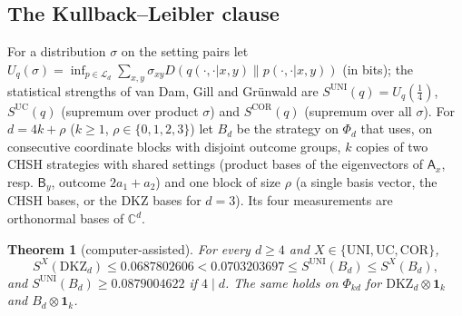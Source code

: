 \documentclass[11pt]{amsart}
\newtheorem{theorem}{Theorem}[section]
\theoremstyle{definition}
\theoremstyle{remark}
\numberwithin{equation}{section}
\newcommand{\C}{\mathbb{C}}
\newcommand{\one}{\mathbf{1}}
\newcommand{\cL}{\mathcal{L}}
\newcommand{\DKZ}{\mathrm{DKZ}}
\begin{document}
\subsection{The Kullback--Leibler clause}
For a distribution $\sigma$ on the setting pairs let
$U_q(\sigma)=\inf_{p\in\cL_d}\sum_{x,y}\sigma_{xy}D(q(\cdot,\cdot|x,y)\|p(\cdot,\cdot|x,y))$ (in bits); the statistical
strengths of van Dam, Gill and Gr\"unwald\cite{vDGG} are $S^{\mathrm{UNI}}(q)=U_q(\frac14)$, $S^{\mathrm{UC}}(q)$ (supremum over
product $\sigma$) and $S^{\mathrm{COR}}(q)$ (supremum over all $\sigma$). For $d=4k+\rho$ ($k\ge1$, $\rho\in\{0,1,2,3\}$)
let $B_d$ be the strategy on $\Phi_d$ that uses, on consecutive coordinate blocks with disjoint outcome groups, $k$
copies of two CHSH strategies with shared settings (product bases of the eigenvectors of $\mathsf A_x$, resp.
$\mathsf B_y$, outcome $2a_1+a_2$) and one block of size $\rho$ (a single basis vector, the CHSH bases, or the DKZ bases
for $d=3$). Its four measurements are orthonormal bases of $\C^d$.

\begin{theorem}[computer-assisted]\label{thm:kl}
For every $d\ge4$ and $X\in\{\mathrm{UNI},\mathrm{UC},\mathrm{COR}\}$,
\[
S^X(\DKZ_d)\le0.0687802606<0.0703203697\le S^{\mathrm{UNI}}(B_d)\le S^X(B_d),
\]
and $S^{\mathrm{UNI}}(B_d)\ge0.0879004622$ if $4\mid d$. The same holds on $\Phi_{kd}$ for $\DKZ_d\otimes\one_k$ and
$B_d\otimes\one_k$.
\end{theorem}
\end{document}

